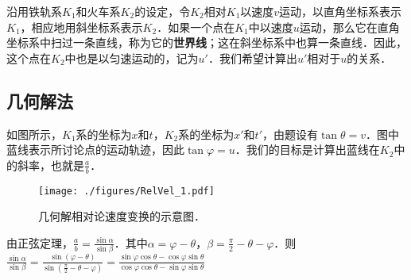 沿用铁轨系$K_1$和火车系$K_2$的设定，令$K_2$相对$K_1$以速度$v$运动，以直角坐标系表示$K_1$，相应地用斜坐标系表示$K_2$．如果一个点在$K_1$中以速度$u$运动，那么它在直角坐标系中扫过一条直线，称为它的\textbf{世界线}；这在斜坐标系中也算一条直线．因此，这个点在$K_2$中也是以匀速运动的，记为$u'$．我们希望计算出$u'$相对于$u$的关系．


\subsection{几何解法}

如图所示，$K_1$系的坐标为$x$和$t$，$K_2$系的坐标为$x'$和$t'$，由题设有$\tan{\theta}=v$．图中蓝线表示所讨论点的运动轨迹，因此$\tan{\varphi}=u$．我们的目标是计算出蓝线在$K_2$中的斜率，也就是$\frac{a}{b}$．


\begin{figure}[ht]
\centering
\texttt{[image: ./figures/RelVel\_1.pdf]}
\caption{几何解相对论速度变换的示意图．} \label{RelVel_fig1}
\end{figure}

由正弦定理，$\frac{a}{b}=\frac{\sin{\alpha}}{\sin{\beta}}$．其中$\alpha=\varphi-\theta$，$\beta=\frac{\pi}{2}-\theta-\varphi$．则$\frac{\sin{\alpha}}{\sin{\beta}}=\frac{\sin{(\varphi-\theta)}}{\sin{(\frac{\pi}{2}-\theta-\varphi)}}=\frac{\sin{\varphi}\cos{\theta}-\cos{\varphi}\sin{\theta}}{\cos{\varphi}\cos{\theta}-\sin{\varphi}\sin{\theta}}$








